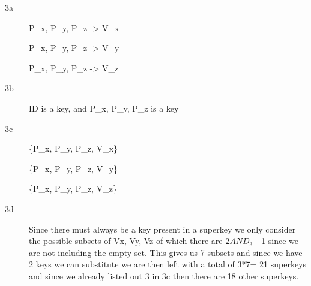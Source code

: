 \documentclass[12pt]{article}
\begin{document}
\begin{description}
\item[3a ] $ $ \\
{P_{x}, P_{y}, P_{z}} -> V_{x}

{P_{x}, P_{y}, P_{z}} -> V_{y}

{P_{x}, P_{y}, P_{z}} -> V_{z}



\clearpage
\item[3b ] $ $ \\

ID is a key, and { P_{x}, P_{y}, P_{z}} is a key



\clearpage
\item[3c ] $ $ \\

\{P_{x}, P_{y}, P_{z}, V_{x}\}

\{P_{x}, P_{y}, P_{z}, V_{y}\}

\{P_{x}, P_{y}, P_{z}, V_{z}\}

\clearpage
\item[3d ] $ $ \\

Since there must always be a key present in a superkey we only consider the possible subsets of {Vx, Vy, Vz} of which there are $2AND_{3}$ - 1 since we are not including the empty set. This gives us 7 subsets and since we have 2 keys we can substitute we are then left with a total of 3*7= 21 superkeys and since we already listed out 3 in 3c then there are 18 other superkeys. 


\clearpage
\end{description}
\end{document}
